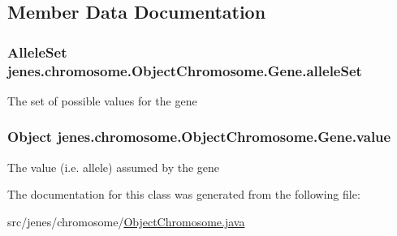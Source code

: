 \subsection{Member Data Documentation}
\hypertarget{classjenes_1_1chromosome_1_1_object_chromosome_1_1_gene_a392d5ec4a86ae43a2bcda010bfa7256b}{
\subsubsection[{allele\-Set}]{\setlength{\rightskip}{0pt plus 5cm}Allele\-Set jenes.\-chromosome.\-Object\-Chromosome.\-Gene.\-allele\-Set\hspace{0.3cm}{\ttfamily [protected]}}}\label{classjenes_1_1chromosome_1_1_object_chromosome_1_1_gene_a392d5ec4a86ae43a2bcda010bfa7256b}
The set of possible values for the gene \hypertarget{classjenes_1_1chromosome_1_1_object_chromosome_1_1_gene_a1f5727f2d06e896665bd77c5b93a78a2}{
\subsubsection[{value}]{\setlength{\rightskip}{0pt plus 5cm}Object jenes.\-chromosome.\-Object\-Chromosome.\-Gene.\-value\hspace{0.3cm}{\ttfamily [protected]}}}\label{classjenes_1_1chromosome_1_1_object_chromosome_1_1_gene_a1f5727f2d06e896665bd77c5b93a78a2}
The value (i.\-e. allele) assumed by the gene 

The documentation for this class was generated from the following file\-:\begin{DoxyCompactItemize}
\item 
src/jenes/chromosome/\hyperlink{_object_chromosome_8java}{Object\-Chromosome.\-java}\end{DoxyCompactItemize}
